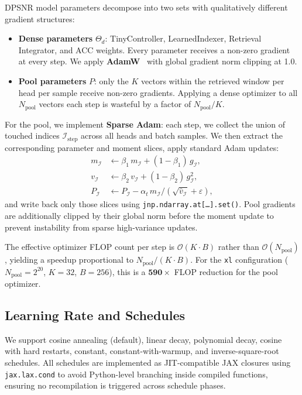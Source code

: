 \documentclass[11pt]{article}
\begin{document}
DPSNR model parameters decompose into two sets with qualitatively different
gradient structures:
\begin{itemize}[leftmargin=1.8em]
  \item \textbf{Dense parameters} $\Theta_d$: TinyController, LearnedIndexer,
        Retrieval Integrator, and ACC weights.
        Every parameter receives a non-zero gradient at every step.
        We apply \textbf{AdamW}~\citep{loshchilov2019adamw} with global
        gradient norm clipping at 1.0.
  \item \textbf{Pool parameters} $P$: only the $K$ vectors within the retrieved
        window per head per sample receive non-zero gradients.
        Applying a dense optimizer to all $N_{\text{pool}}$ vectors each step
        is wasteful by a factor of $N_{\text{pool}} / K$.
\end{itemize}

For the pool, we implement \textbf{Sparse Adam}: each step, we collect the
union of touched indices $\mathcal{I}_{\text{step}}$ across all heads and
batch samples. We then extract the corresponding parameter and moment slices,
apply standard Adam updates:
\begin{align}
  m_{\mathcal{I}} &\leftarrow \beta_1\,m_{\mathcal{I}}
    + (1-\beta_1)\,g_{\mathcal{I}},\\
  v_{\mathcal{I}} &\leftarrow \beta_2\,v_{\mathcal{I}}
    + (1-\beta_2)\,g_{\mathcal{I}}^2,\\
  P_{\mathcal{I}} &\leftarrow P_{\mathcal{I}}
    - \alpha_t\,\hat{m}_{\mathcal{I}} / (\sqrt{\hat{v}_{\mathcal{I}}} + \varepsilon),
\end{align}
and write back only those slices using \texttt{jnp.ndarray.at[\ldots].set()}.
Pool gradients are additionally clipped by their global norm before the moment
update to prevent instability from sparse high-variance updates.

The effective optimizer FLOP count per step is $\mathcal{O}(K \cdot B)$ rather
than $\mathcal{O}(N_{\text{pool}})$, yielding a speedup proportional to
$N_{\text{pool}} / (K \cdot B)$. For the \texttt{xl} configuration
($N_{\text{pool}} = 2^{20}$, $K=32$, $B=256$), this is a
$\mathbf{590\times}$ FLOP reduction for the pool optimizer.

\subsection{Learning Rate and Schedules}

We support cosine annealing (default), linear decay, polynomial decay,
cosine with hard restarts, constant, constant-with-warmup, and
inverse-square-root schedules.
All schedules are implemented as JIT-compatible JAX closures using
\texttt{jax.lax.cond} to avoid Python-level branching inside compiled
functions, ensuring no recompilation is triggered across schedule phases.
\end{document}
